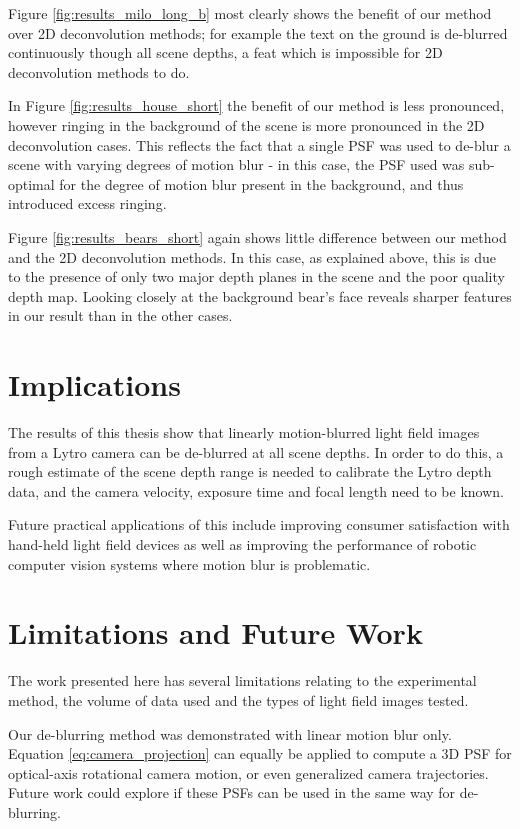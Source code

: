 Figure \ref{fig:results_milo_long_b} most clearly shows the benefit of our method over 2D deconvolution methods; for example the text on the ground is de-blurred continuously though all scene depths, a feat which is impossible for 2D deconvolution methods to do.

In Figure \ref{fig:results_house_short} the benefit of our method is less pronounced, however ringing in the background of the scene is more pronounced in the 2D deconvolution cases.
This reflects the fact that a single PSF was used to de-blur a scene with varying degrees of motion blur - in this case, the PSF used was sub-optimal for the degree of motion blur present in the background, and thus introduced excess ringing.

Figure \ref{fig:results_bears_short} again shows little difference between our method and the 2D deconvolution methods.
In this case, as explained above, this is due to the presence of only two major depth planes in the scene and the poor quality depth map.
Looking closely at the background bear's face reveals sharper features in our result than in the other cases.

\section{Implications}
\label{sec:implications}

The results of this thesis show that linearly motion-blurred light field images from a Lytro camera can be de-blurred at all scene depths.
In order to do this, a rough estimate of the scene depth range is needed to calibrate the Lytro depth data, and the camera velocity, exposure time and focal length need to be known.

Future practical applications of this include improving consumer satisfaction with hand-held light field devices as well as improving the performance of robotic computer vision systems where motion blur is problematic.


\section{Limitations and Future Work}
\label{sec:limitations_and_future_work}

The work presented here has several limitations relating to the experimental method, the volume of data used and the types of light field images tested.

Our de-blurring method was demonstrated with linear motion blur only.
Equation \ref{eq:camera_projection} can equally be applied to compute a 3D PSF for optical-axis rotational camera motion, or even generalized camera trajectories.
Future work could explore if these PSFs can be used in the same way for de-blurring.

